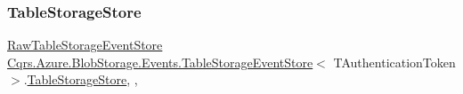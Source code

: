 \subsubsection{\texorpdfstring{Table\+Storage\+Store}{TableStorageStore}}
{\footnotesize\ttfamily \hyperlink{classCqrs_1_1Azure_1_1BlobStorage_1_1Events_1_1TableStorageEventStore_1_1RawTableStorageEventStore}{Raw\+Table\+Storage\+Event\+Store} \hyperlink{classCqrs_1_1Azure_1_1BlobStorage_1_1Events_1_1TableStorageEventStore}{Cqrs.\+Azure.\+Blob\+Storage.\+Events.\+Table\+Storage\+Event\+Store}$<$ T\+Authentication\+Token $>$.\hyperlink{classCqrs_1_1Azure_1_1BlobStorage_1_1TableStorageStore}{Table\+Storage\+Store}\hspace{0.3cm}{\ttfamily [get]}, {\ttfamily [set]}, {\ttfamily [protected]}}

